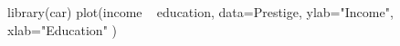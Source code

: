 \begin{Schunk}
\begin{Sinput}
 library(car)
 plot(income ~ education, data=Prestige, ylab="Income", xlab="Education" )
\end{Sinput}
\end{Schunk}
